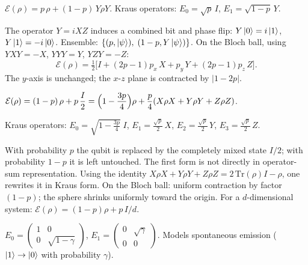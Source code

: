 \documentclass[10pt,a4paper]{article}
\begin{document}
\begin{tcolorbox}[defstyle, title={Definition: Bit-Phase Flip Channel}]
$\mathcal{E}(\rho)=p\,\rho+(1-p)\,Y\rho Y$. Kraus operators: $E_0=\sqrt{p}\,I$, $E_1=\sqrt{1-p}\,Y$.
\end{tcolorbox}

The operator $Y=iXZ$ induces a combined bit and phase flip: $Y\ket{0}=i\ket{1}$, $Y\ket{1}=-i\ket{0}$. Ensemble: $\{(p,\ket{\psi}),\;(1-p,Y\ket{\psi})\}$. On the Bloch ball, using $YXY=-X$, $YYY=Y$, $YZY=-Z$:
\[
\mathcal{E}(\rho)=\tfrac{1}{2}\bigl[I+(2p-1)p_x\,X+p_y\,Y+(2p-1)p_z\,Z\bigr].
\]
The $y$-axis is unchanged; the $x$-$z$ plane is contracted by $|1-2p|$.

\begin{tcolorbox}[defstyle, title={Definition: Depolarizing Channel}]
$\mathcal{E}(\rho)=(1-p)\,\rho+p\,\dfrac{I}{2}=\Bigl(1-\dfrac{3p}{4}\Bigr)\rho+\dfrac{p}{4}(X\rho X+Y\rho Y+Z\rho Z)$.

Kraus operators: $E_0=\sqrt{1-\tfrac{3p}{4}}\;I$, $E_1=\tfrac{\sqrt{p}}{2}\,X$, $E_2=\tfrac{\sqrt{p}}{2}\,Y$, $E_3=\tfrac{\sqrt{p}}{2}\,Z$.
\end{tcolorbox}

With probability $p$ the qubit is replaced by the completely mixed state $I/2$; with probability $1-p$ it is left untouched. The first form is not directly in operator-sum representation. Using the identity $X\rho X+Y\rho Y+Z\rho Z=2\,\mathrm{Tr}(\rho)I-\rho$, one rewrites it in Kraus form. On the Bloch ball: uniform contraction by factor $(1-p)$; the sphere shrinks uniformly toward the origin. For a $d$-dimensional system: $\mathcal{E}(\rho)=(1-p)\rho+p\,I/d$.

\begin{tcolorbox}[defstyle, title={Definition: Amplitude Damping Channel}]
$E_0=\begin{pmatrix}1&0\\0&\sqrt{1-\gamma}\end{pmatrix}$, $E_1=\begin{pmatrix}0&\sqrt{\gamma}\\0&0\end{pmatrix}$. Models spontaneous emission ($\ket{1}\to\ket{0}$ with probability $\gamma$).
\end{tcolorbox}
\end{document}
